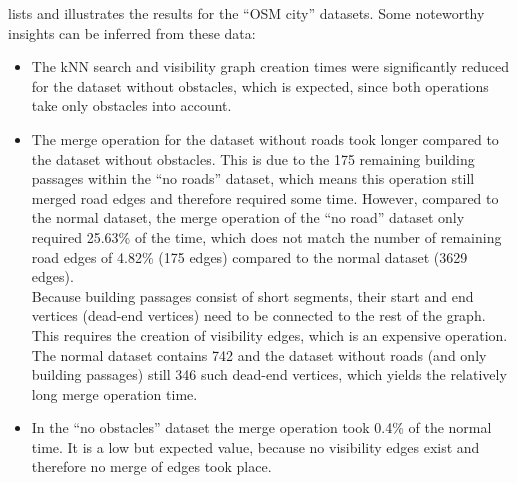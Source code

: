 			\noindent
			 lists and illustrates the results for the \enquote{OSM city} datasets.
			Some noteworthy insights can be inferred from these data:
			\begin{itemize}
				\item The kNN search and visibility graph creation times were significantly reduced for the dataset without obstacles, which is expected, since both operations take only obstacles into account.
				\item The merge operation for the dataset without roads took longer compared to the dataset without obstacles.
				This is due to the 175 remaining building passages within the \enquote{no roads} dataset, which means this operation still merged road edges and therefore required some time.
				However, compared to the normal dataset, the merge operation of the \enquote{no road} dataset only required 25.63\% of the time, which does not match the number of remaining road edges of 4.82\% (175 edges) compared to the normal dataset (3629 edges).\\
				Because building passages consist of short segments, their start and end vertices (dead-end vertices) need to be connected to the rest of the graph.
				This requires the creation of visibility edges, which is an expensive operation.
				The normal dataset contains 742 and the dataset without roads (and only building passages) still 346 such dead-end vertices, which yields the relatively long merge operation time.
				\item In the \enquote{no obstacles} dataset the merge operation took 0.4\% of the normal time. It is a low but expected value, because no visibility edges exist and therefore no merge of edges took place.
			\end{itemize}
			
